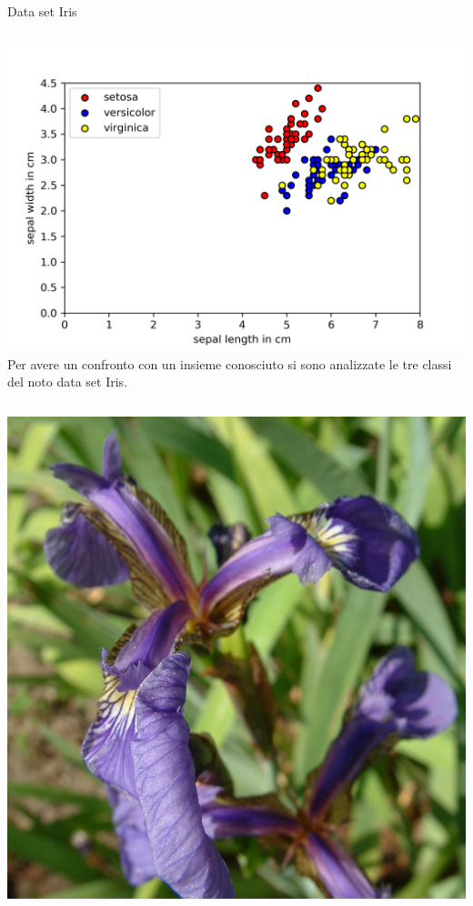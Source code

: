 \documentclass{beamer}
\begin{document}
    \begin{frame}{Data set Iris}
        \begin{columns}
            \includegraphics[width=\columnwidth]{gfx/iris/iris4features}
            Per avere un confronto con un insieme conosciuto si sono analizzate le tre classi del noto data set Iris. 
        \end{columns}
        \vspace{.5cm}
        \begin{columns}
            \includegraphics[width=\columnwidth]{gfx/iris/Iris_setosa.jpg}

\end{columns}
\end{frame}
\end{document}
